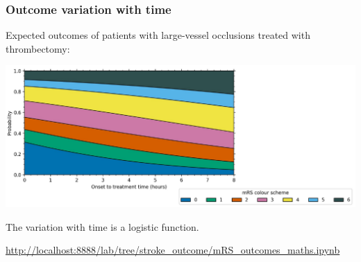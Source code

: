 \documentclass[xcolor={usenames,dvipsnames}]{beamer}
\newcommand{\smallurl}[1]{\textcolor{blue}{\fontsize{4pt}{4.8pt}\selectfont \url{#1}}}
\begin{document}

\begin{frame}
\frametitle{Outcome variation with time}

Expected outcomes of patients with large-vessel occlusions treated with thrombectomy: 

\begin{center} 
\includegraphics[width=\textwidth]{./images/probs_with_time_not_annotated}
\end{center} 




The variation with time is a logistic function. 
\phantom{If treated at time 3h30min, Patient X will see an improvement in mRS score of 1 c.}

\vspace{1em}
\smallurl{http://localhost:8888/lab/tree/stroke_outcome/mRS_outcomes_maths.ipynb}

\end{frame}


\end{document}
